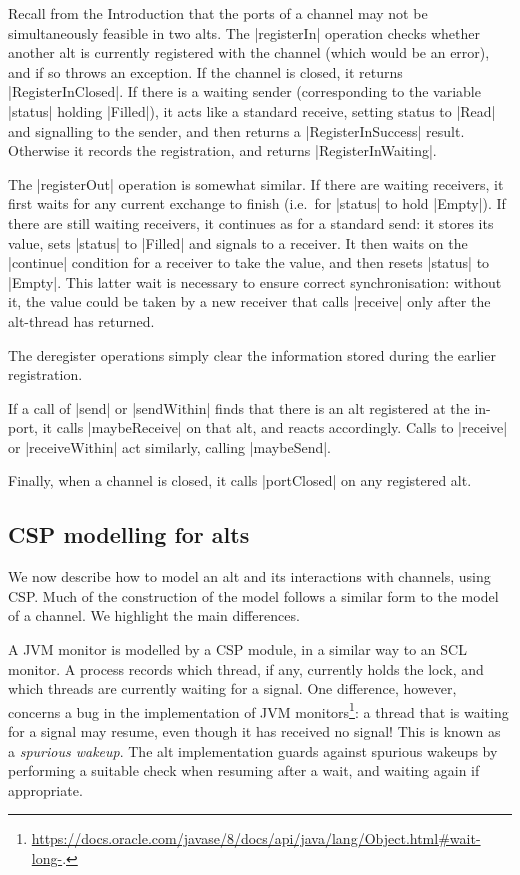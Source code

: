 Recall from the Introduction that the ports of a channel may not be
simultaneously feasible in two alts.
The |registerIn| operation checks whether another alt is currently registered
with the channel (which would be an error), and if so throws an exception.  If
the channel is closed, it returns |RegisterInClosed|.  If there is a waiting
sender (corresponding to the variable |status| holding |Filled|), it acts like
a standard receive, setting status to |Read| and signalling to the sender, and
then returns a |RegisterInSuccess| result.  Otherwise it records the
registration, and returns |RegisterInWaiting|.

The |registerOut| operation is somewhat similar.  If there are waiting
receivers, it first waits for any current exchange to finish (i.e.~for
|status| to hold |Empty|).  If there are still waiting receivers, it continues
as for a standard send: it stores its value, sets |status| to |Filled| and
signals to a receiver.  It then waits on the |continue| condition for a
receiver to take the value, and then resets |status| to |Empty|.  This latter
wait is necessary to ensure correct synchronisation: without it, the value
could be taken by a new receiver that calls |receive| only after the
alt-thread has returned.

The deregister operations simply clear the information stored during the
earlier registration.

If a call of |send| or |sendWithin| finds that there is an alt registered at
the in-port, it calls |maybeReceive| on that alt, and reacts accordingly.
Calls to |receive| or |receiveWithin| act similarly, calling |maybeSend|.  

Finally, when a channel is closed, it calls |portClosed| on any registered alt. 


\subsection{CSP modelling for alts}

\inlineCSP

We now describe how to model an alt and its interactions with channels, using
CSP\@.  Much of the construction of the model follows a similar form to the
model of a channel.  We highlight the main differences. 

A JVM monitor is modelled by a CSP module, in a similar way to an SCL monitor.
A process records which thread, if any, currently holds the lock, and which
threads are currently waiting for a signal.  One difference, however, concerns
a bug in the implementation of JVM monitors\footnote{%
  \url{https://docs.oracle.com/javase/8/docs/api/java/lang/Object.html#wait-long-}.}:
a thread that is waiting for a signal may resume, even though it has received
no signal!  This is known as a \emph{spurious wakeup}.  The alt implementation
guards against spurious wakeups by performing a suitable check when resuming
after a wait, and waiting again if appropriate.


